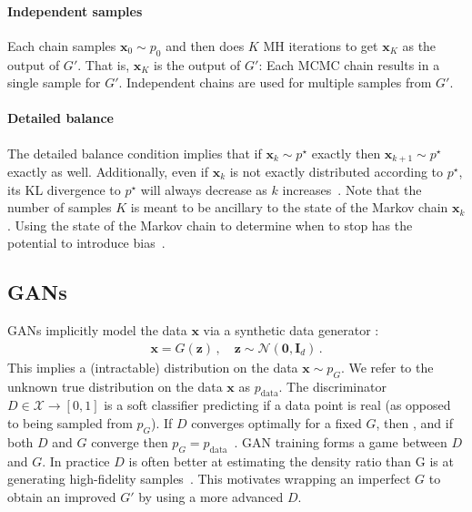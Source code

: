 \documentclass{article}
\renewcommand{\vec}[1]{{\boldsymbol{\mathbf{#1}}}} %
\newcommand{\R}{\mathbb{R}}
\newcommand{\set}[1]{\mathcal{#1}}
\newcommand{\sample}{\sim}
\newcommand{\norm}{\mathcal{N}}
\newcommand{\target}{{p^\star}}
\newcommand{\pinit}{{p_0}}
\newcommand{\PG}{{p_G}}
\newcommand{\PR}{{p_{\textrm{data}}}}
\newcommand{\setx}{\set{X}}
\begin{document}
\paragraph{Independent samples}
Each chain samples $\vec x_0 \sample \pinit$ and then does $K$ MH iterations to get $\vec x_K$ as the output of $G'$.
That is, $\vec x_K$ is the output of $G'$: Each MCMC chain results in a single sample for $G'$.
Independent chains are used for multiple samples from $G'$.

\paragraph{Detailed balance}
The detailed balance condition implies that if $\vec x_k \sample \target$ exactly then $\vec x_{k+1} \sample \target$ exactly as well.
Additionally, even if $\vec x_k$ is not exactly distributed according to $\target$, its KL divergence to $\target$ will always decrease as $k$ increases~\citep{Murray2008,Cover2012}.
Note that the number of samples $K$ is meant to be ancillary to the state of the Markov chain $\vec x_k$.
Using the state of the Markov chain to determine when to stop has the potential to introduce bias~\citep{Cowles1999}.

\subsection{GANs}
\label{sec:GANs}

GANs implicitly model the data $\vec x$ via a synthetic data generator \smash{$G \in \R^{d} \rightarrow \setx$}:
\begin{align}
  \vec x = G(\vec z)\,, \quad \vec z \sample \norm(\vec 0, \vec I_{d})\,.
\end{align}
This implies a (intractable) distribution on the data $\vec x \sample \PG$.
We refer to the unknown true distribution on the data $\vec x$ as $\PR$.
The discriminator $D \in \setx \rightarrow [0,1]$ is a soft classifier predicting if a data point is real (as opposed to being sampled from $\PG$)\@.
If $D$ converges optimally for a fixed $G$, then \smash{$D = \PR/(\PR + \PG)$}, and if both $D$ and $G$ converge then $\PG = \PR$~\citep{Goodfellow2014}.
GAN training forms a game between $D$ and $G$.
In practice $D$ is often better at estimating the density ratio than G is at generating high-fidelity samples~\citep{Shibuya2017}.
This motivates wrapping an imperfect $G$ to obtain an improved $G'$ by using a more advanced $D$.
\end{document}
